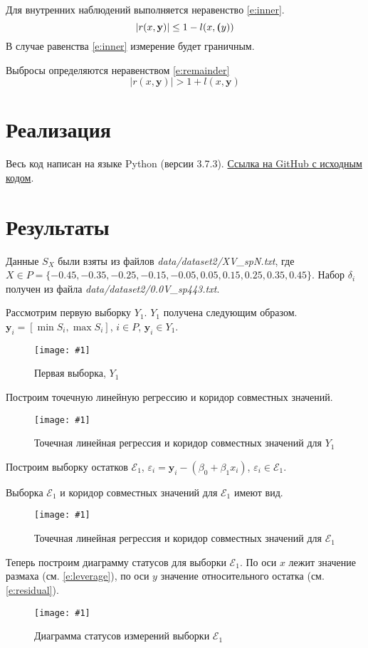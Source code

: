 \documentclass[a4paper,12pt]{article}
\newcommand{\plot}[3]{
    \begin{figure}[H]
        \begin{center}
            \texttt{[image: \#1]}
            \caption{#2}
            \label{#3}
        \end{center}
    \end{figure}
}
\begin{document}
    Для внутренних наблюдений выполняется неравенство \ref{e:inner}.
    \begin{equation}
        |r(x, \textbf{y})| \leq 1 - l(x, \textbf(y))
        \label{e:inner}
    \end{equation}
    В случае равенства \ref{e:inner} измерение будет граничным.

    Выбросы определяются неравенством \ref{e:remainder}
    \begin{equation}
        |r(x, \textbf{y})| > 1 + l(x, \textbf{y})
        \label{e:remainder}
    \end{equation}

    \section{Реализация}
    \quad Весь код написан на языке Python (версии 3.7.3).
    \href{https://github.com/kirillkuks/Intervals/tree/master/lab3}{Ссылка на GitHub с исходным кодом}.

    \section{Результаты}
    \quad Данные $ S_X $ были взяты из файлов \textsl{data/dataset2/XV\_spN.txt}, \newline
    где $ X \in P = \{-0.45, -0.35, -0.25, -0.15, -0.05, 0.05, 0.15, 0.25, 0.35, 0.45 \} $.
    Набор $ \delta_i $ получен из файла \textsl{data/dataset2/0.0V\_sp443.txt}.

    Рассмотрим первую выборку $ Y_1 $. $ Y_1 $ получена следующим образом.
    $ \textbf{y}_i = [\min{S_i}, \max{S_i}]$, $ i \in P $, $ \textbf{y}_i \in Y_1 $.
    \plot{SampleX1}{Первая выборка, $ Y_1 $}{p:sampleX1}

    Построим точечную линейную регрессию и коридор совместных значений.
    \plot{InformSetCorridorX1}{Точечная линейная регрессия и коридор совместных значений для $ Y_1 $}{p:informSetCorridorX1}

    Построим выборку остатков $ \mathcal{E}_1 $, $ \varepsilon_i = \textbf{y}_i - (\beta_0 + \beta_1 x_i) $,
    $ \varepsilon_i \in \mathcal{E}_1 $.

    Выборка $ \mathcal{E}_1 $ и коридор совместных значений для $ \mathcal{E}_1 $ имеют вид.
    \plot{InformSetCorridorRemX1}{Точечная линейная регрессия и коридор совместных значений для $ \mathcal{E}_1 $}{p:informSetCorridorRemX1}

    Теперь построим диаграмму статусов для выборки $ \mathcal{E}_1 $.
    По оси $ x $ лежит значение размаха (см. \ref{e:leverage}), по оси $ y $ значение относительного остатка (см. \ref{e:residual}).
    \plot{DiagramStatusX1}{Диаграмма статусов измерений выборки $ \mathcal{E}_1 $}{p:diagramStatusX1}
\end{document}
